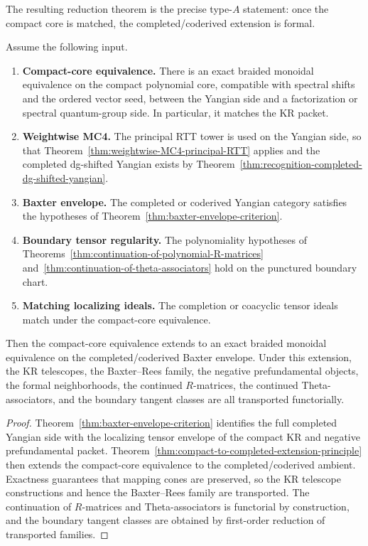 The resulting reduction theorem is the precise type-$A$ statement: once
the compact core is matched, the completed/coderived extension is formal.

\begin{theorem}
\ClaimStatusProvedHere
\label{thm:typeA-reduction-full-derived-DK-frontier}
Assume the following input.
\begin{enumerate}
 \item \textbf{Compact-core equivalence.}
 There is an exact braided monoidal equivalence on the compact
 polynomial core, compatible with spectral shifts and the ordered
 vector seed, between the Yangian side and a factorization or spectral
 quantum-group side. In particular, it matches the KR packet.
 \item \textbf{Weightwise MC4.}
 The principal RTT tower is used on the Yangian side, so that
 Theorem~\ref{thm:weightwise-MC4-principal-RTT} applies and the
 completed dg-shifted Yangian exists by
 Theorem~\ref{thm:recognition-completed-dg-shifted-yangian}.
 \item \textbf{Baxter envelope.}
 The completed or coderived Yangian category satisfies the hypotheses
 of Theorem~\ref{thm:baxter-envelope-criterion}.
 \item \textbf{Boundary tensor regularity.}
 The polynomiality hypotheses of
 Theorems~\ref{thm:continuation-of-polynomial-R-matrices}
 and~\ref{thm:continuation-of-theta-associators} hold on the punctured
 boundary chart.
 \item \textbf{Matching localizing ideals.}
 The completion or coacyclic tensor ideals match under the compact-core
 equivalence.
\end{enumerate}
Then the compact-core equivalence extends to an exact braided monoidal
equivalence on the completed/coderived Baxter envelope. Under this
extension, the KR telescopes, the Baxter--Rees family, the negative
prefundamental objects, the formal neighborhoods, the continued
$R$-matrices, the continued Theta-associators, and the boundary tangent
classes are all transported functorially.
\end{theorem}

\begin{proof}
Theorem~\ref{thm:baxter-envelope-criterion} identifies the full completed
Yangian side with the localizing tensor envelope of the compact KR and
negative prefundamental packet. Theorem~\ref{thm:compact-to-completed-extension-principle}
then extends the compact-core equivalence to the completed/coderived
ambient. Exactness guarantees that mapping cones are preserved, so the KR
telescope constructions and hence the Baxter--Rees family are transported.
The continuation of $R$-matrices and Theta-associators is functorial by
construction, and the boundary tangent classes are obtained by first-order
reduction of transported families.
\end{proof}

